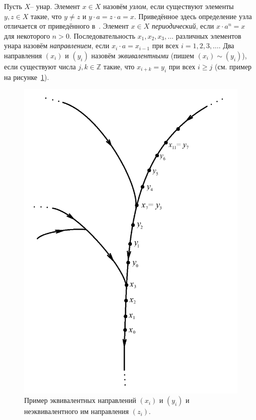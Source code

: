 \documentclass[11pt,twoside,draft
]{article}
\begin{document}
Пусть $X$-- унар.
Элемент $x \in X$ назовём \textit{узлом}, если существуют элементы $y,z \in X$ такие, что $y \neq z$ и $y \cdot a = z \cdot a = x$.
Приведённое здесь определение узла отличается от приведённого в~\cite{Kozhukhov_8}.
Элемент $x \in X$ \textit{периодический}, если $x \cdot a^n = x$ для некоторого $n > 0$.
Последовательность $x_1,x_2,x_3,\ldots$ различных элементов унара назовём \textit{направлением}, если $x_i \cdot a = x_{i - 1}$ при всех $i = 1,2,3,\ldots$.
Два направления $(x_i)$ и $(y_i)$ назовём \textit{эквивалентными} (пишем $(x_i) \sim (y_i)$), если существуют числа $j,k \in \mathbb{Z}$ такие, что $x_{i+k} = y_i$ при всех $i \geqslant j$ (см. пример на рисунке~\ref{fig:eq_dir}).
\begin{figure}[ht!]
	\centering
	\includegraphics[scale=1]{img/eq_dir.png} %
	\caption{Пример эквивалентных направлений $(x_i)$ и $(y_i)$ и неэквивалентного им направления $(z_i)$.}
	\label{fig:eq_dir}
\end{figure}
\end{document}
